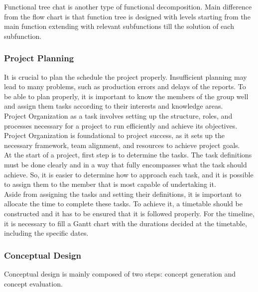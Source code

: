 \documentclass[12pt]{report}
\begin{document}
Functional tree chat is another type of functional decomposition. Main difference from the flow chart is that function tree is designed with levels starting from the main function extending with relevant subfunctions till the solution of each subfunction. \\

\subsubsection{Project Planning}
It is crucial to plan the schedule the project properly. Insufficient planning may lead to many problems, such as production errors and delays of the reports. To be able to plan properly, it is important to know the members of the group well and assign them tasks according to their interests and knowledge areas. \\

Project Organization as a task involves setting up the structure, roles, and processes necessary for a project to run efficiently and achieve its objectives. Project Organization is foundational to project success, as it sets up the necessary framework, team alignment, and resources to achieve project goals. \\

At the start of a project, first step is to determine the tasks. The task definitions must be done clearly and in a way that fully encompasses what the task should achieve. So, it is easier to determine how to approach each task, and it is possible to assign them to the member that is most capable of undertaking it. \\

Aside from assigning the tasks and setting their definitions, it is important to allocate the time to complete these tasks. To achieve it, a timetable should be constructed and it has to be ensured that it is followed properly. For the timeline, it is necessary to fill a Gantt chart with the durations decided at the timetable, including the specific dates. 

\subsubsection{Conceptual Design}
Conceptual design is mainly composed of two steps: concept generation and concept evaluation. \\
\end{document}
